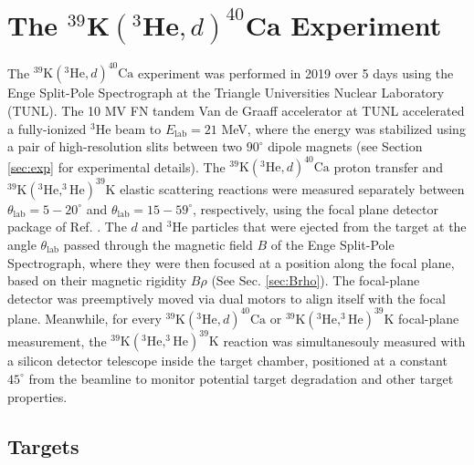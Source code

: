 \section{The $^{39}\mathrm{\textbf{K}}(^{3}\mathrm{\textbf{He}},d)^{40}\mathrm{\textbf{Ca}}$ Experiment}


The $^{39}\mathrm{K}(^{3}\mathrm{He}, d)^{40}\mathrm{Ca}$ experiment was performed in 2019 over 5 days using the Enge Split-Pole Spectrograph at the Triangle Universities Nuclear Laboratory (TUNL). The 10 MV FN tandem Van de Graaff accelerator at TUNL accelerated a fully-ionized $^{3}$He beam to  $E_{\mathrm{lab}} = 21$ MeV, where the energy was stabilized using a pair of high-resolution slits between two $90^{\circ}$ dipole magnets (see Section \ref{sec:exp} for experimental details). The $^{39}\mathrm{K}(^{3}\mathrm{He},d)^{40}\mathrm{Ca}$ proton transfer and $^{39}\mathrm{K}(^{3}\mathrm{He},^{3}\mathrm{He})^{39}\mathrm{K}$ elastic scattering reactions were measured separately between $\theta_{\mathrm{lab}} = 5-20^{\circ}$ and $ \theta_{\mathrm{lab}} = 15-59^{\circ}$, respectively, using the focal plane detector package of Ref. \cite{Marshall2019}. The $d$ and $^{3}$He particles that were ejected from the target at the angle $\theta_{\mathrm{lab}}$ passed through the magnetic field $B$ of the Enge Split-Pole Spectrograph, where they were then focused at a position along the focal plane, based on their magnetic rigidity $B\rho$ (See Sec. \ref{sec:Brho}). The focal-plane detector was preemptively moved via dual motors to align itself with the focal plane. Meanwhile, for every $^{39}\mathrm{K}(^{3}\mathrm{He},d)^{40}\mathrm{Ca}$ or $^{39}\mathrm{K}(^{3}\mathrm{He},^{3}\mathrm{He})^{39}\mathrm{K}$ focal-plane measurement, the $^{39}\mathrm{K}(^{3}\mathrm{He},^{3}\mathrm{He})^{39}\mathrm{K}$ reaction was simultanesouly measured with a silicon detector telescope inside the target chamber, positioned at a constant $45^{\circ}$ from the beamline to monitor potential target degradation and other target properties.

\subsection{Targets}

